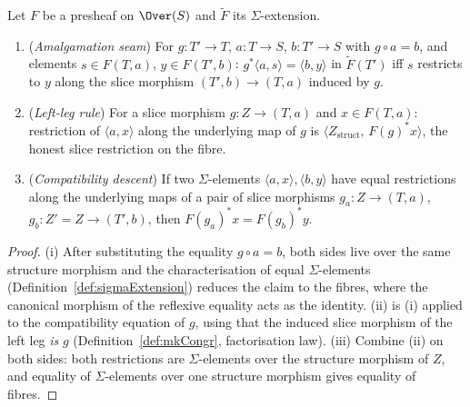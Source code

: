 \begin{lemma}
  \label{lem:sigmaExtension_seams}
  \leanok
  Let \(F\) be a presheaf on \(\Over(S)\) and \(\widetilde F\) its \(\Sigma\)-extension.
  \begin{enumerate}
  \item (\emph{Amalgamation seam}) For \(g \colon T' \to T\), \(a \colon T \to S\),
    \(b \colon T' \to S\) with \(g \circ a = b\), and elements \(s \in F(T,a)\),
    \(y \in F(T',b)\):
    \(g^{*}\langle a, s\rangle = \langle b, y\rangle\) in \(\widetilde F(T')\) iff
    \(s\) restricts to \(y\) along the slice morphism \((T',b) \to (T,a)\) induced by \(g\).
  \item (\emph{Left-leg rule}) For a slice morphism \(g \colon Z \to (T,a)\) and
    \(x \in F(T,a)\): restriction of \(\langle a, x\rangle\) along the underlying map of
    \(g\) is \(\langle Z_{\mathrm{struct}},\, F(g)^{*}x \rangle\), the honest slice
    restriction on the fibre.
  \item (\emph{Compatibility descent}) If two \(\Sigma\)-elements
    \(\langle a, x\rangle, \langle b, y\rangle\) have equal restrictions along the
    underlying maps of a pair of slice morphisms \(g_a \colon Z \to (T,a)\),
    \(g_b \colon Z' = Z \to (T',b)\), then \(F(g_a)^{*}x = F(g_b)^{*}y\).
  \end{enumerate}
\end{lemma}
\begin{proof}
  \leanok
  (i) After substituting the equality \(g \circ a = b\), both sides live over the same
  structure morphism and the characterisation of equal \(\Sigma\)-elements
  (Definition~\ref{def:sigmaExtension}) reduces the claim to the fibres, where the canonical
  morphism of the reflexive equality acts as the identity. (ii) is (i) applied to the
  compatibility equation of \(g\), using that the induced slice morphism of the left leg
  \emph{is} \(g\) (Definition~\ref{def:mkCongr}, factorisation law). (iii) Combine (ii) on
  both sides: both restrictions are \(\Sigma\)-elements over the structure morphism of
  \(Z\), and equality of \(\Sigma\)-elements over one structure morphism gives equality of
  fibres.
\end{proof}

